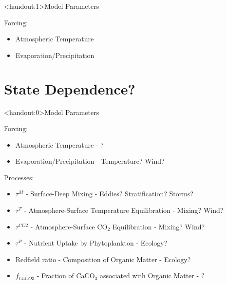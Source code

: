 \documentclass[aspectratio=169]{beamer}
\begin{document}
\begin{frame}<handout:1>{Model Parameters}
    
    Forcing:
    \begin{itemize}
        \item Atmospheric Temperature
        \item Evaporation/Precipitation
    \end{itemize}


\end{frame}

\section{State Dependence?}

\begin{frame}<handout:0>{Model Parameters}
    
    Forcing:
    \begin{itemize}
        \item Atmospheric Temperature - {\color{QESdarkblue} ?}
        \item Evaporation/Precipitation - {\color{QESdarkblue} Temperature? Wind?}
    \end{itemize}

    Processes:
    \begin{itemize}
        \item $\tau^M$ - Surface-Deep Mixing - {\color{QESdarkblue} Eddies? Stratification? Storms?}
        \item $\tau^T$ - Atmosphere-Surface Temperature Equilibration - {\color{QESdarkblue} Mixing? Wind?}
        \item $\tau^{CO2}$ - Atmosphere-Surface CO$_2$ Equilibration - {\color{QESdarkblue} Mixing? Wind?}
        \item $\tau^P$ - Nutrient Uptake by Phytoplankton - {\color{QESdarkblue} Ecology?}
        \item Redfield ratio - Composition of Organic Matter - {\color{QESdarkblue} Ecology?}
        \item $f_{CaCO3}$ - Fraction of CaCO$_3$ associated with Organic Matter - {\color{QESdarkblue} \ce{\Omega}?}
    \end{itemize}

\end{frame}
\end{document}
